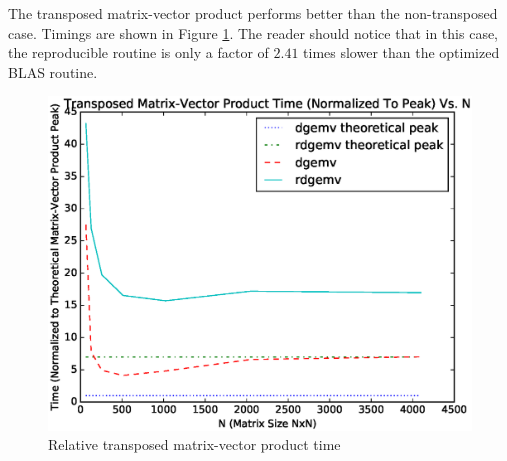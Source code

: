   The transposed matrix-vector product performs better than the non-transposed case. Timings are shown in Figure \ref{fig:gemv_trans_timings}. The reader should notice that in this case, the reproducible routine is only a factor of $2.41$ times slower than the optimized BLAS routine.
  \begin{figure}[H]
  \begin{center}
  \includegraphics[width=\textwidth]{plots/gemv_trans_comparison}
  \caption{Relative transposed matrix-vector product time}
  \label{fig:gemv_trans_timings}
  \end{center}
  \end{figure}

